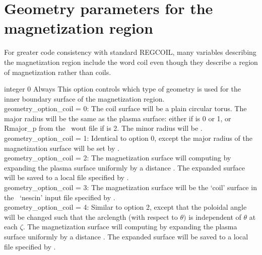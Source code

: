 \myhrule

\section{Geometry parameters for the magnetization region}

For greater code consistency with standard REGCOIL, many variables describing the magnetization region include the word {\ttfamily coil}
even though they describe a region of magnetization rather than coils.

\myhrule

{integer}
{0}
{Always}
{This option controls which type of geometry is used for the inner boundary surface of the magnetization region.\\

{\ttfamily geometry\_option\_coil} = 0: The coil surface will be a plain circular torus. The major radius will be the 
same as the plasma surface: either  if  is 0 or 1, or {\ttfamily Rmajor\_p} from the \vmec~{\ttfamily wout} file
if   is 2.
     The minor radius will be .\\

{\ttfamily geometry\_option\_coil} = 1: Identical to option 0, except the major radius of the magnetization surface will be set by .\\

{\ttfamily geometry\_option\_coil} = 2: The magnetization surface will computing by expanding the plasma surface uniformly by a distance . The expanded surface will be saved to a local file specified by . \\

{\ttfamily geometry\_option\_coil} = 3: The magnetization surface will be the `coil' surface in the \nescoil~`nescin' input file specified by . \\

{\ttfamily geometry\_option\_coil} = 4: Similar to option 2, except that the poloidal angle will be changed such that the arclength (with respect to $\theta)$ is independent of $\theta$ at each $\zeta$. The magnetization surface will computing by expanding the plasma surface uniformly by a distance . The expanded surface will be saved to a local file specified by . \\
}

